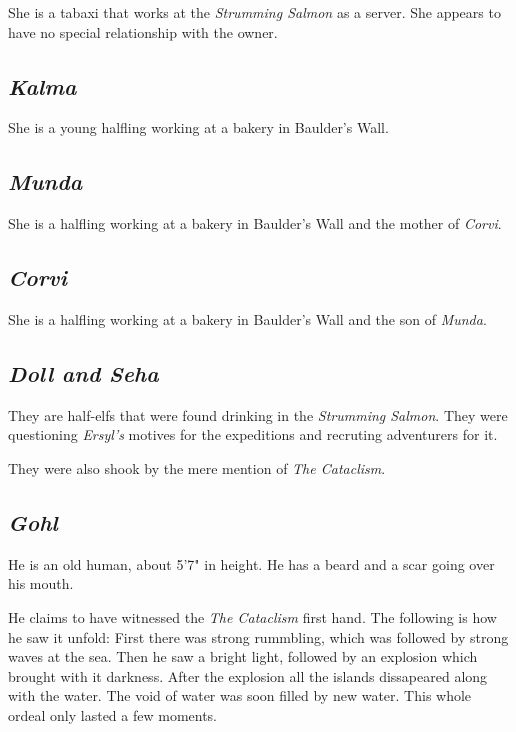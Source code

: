 \documentclass{article}
\begin{document}
\begin{multicols}{2}
    She is a tabaxi that works at the \textit{Strumming Salmon} as a server. She appears to have no special relationship with the owner.

    \subsection{\textit{Kalma}}

    She is a young halfling working at a bakery in Baulder's Wall.

    \subsection{\textit{Munda}}

    She is a halfling working at a bakery in Baulder's Wall and the mother of \textit{Corvi}.

    \subsection{\textit{Corvi}}

    She is a halfling working at a bakery in Baulder's Wall and the son of \textit{Munda}.

    \subsection{\textit{Doll and Seha}}

    They are half-elfs that were found drinking in the \textit{Strumming Salmon}. They were questioning \textit{Ersyl's} motives for the expeditions and recruting adventurers for it.

    They were also shook by the mere mention of \textit{The Cataclism}.

    \subsection{\textit{Gohl}}

    He is an old human, about 5'7" in height. He has a beard and a scar going over his mouth.

    He claims to have witnessed the \textit{The Cataclism} first hand. The following is how he saw it unfold:
    First there was strong rummbling, which was followed by strong waves at the sea. Then he saw a bright light, followed by an explosion which brought with it darkness. After the explosion all the islands
    dissapeared along with the water. The void of water was soon filled by new water.
    This whole ordeal only lasted a few moments.


\end{multicols}
\end{document}
